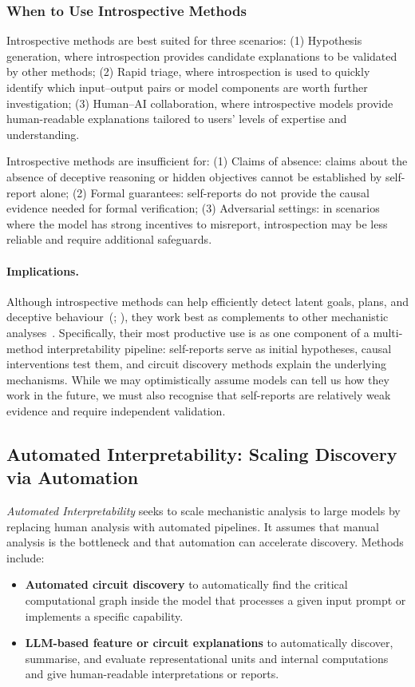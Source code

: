 \subsubsection{When to Use Introspective Methods}
Introspective methods are best suited for three scenarios: (1) Hypothesis generation, where introspection provides candidate explanations to be validated by other methods; (2) Rapid triage, where introspection is used to quickly identify which input--output pairs or model components are worth further investigation; (3) Human--AI collaboration, where introspective models provide human-readable explanations tailored to users' levels of expertise and understanding.

Introspective methods are insufficient for: (1) Claims of absence: claims about the absence of deceptive reasoning or hidden objectives cannot be established by self-report alone; (2) Formal guarantees: self-reports do not provide the causal evidence needed for formal verification; (3) Adversarial settings: in scenarios where the model has strong incentives to misreport, introspection may be less reliable and require additional safeguards.

\paragraph{Implications.}
Although introspective methods can help efficiently detect latent goals, plans, and deceptive behaviour~(; ), they work best as complements to other mechanistic analyses~. Specifically, their most productive use is as one component of a multi-method interpretability pipeline: self-reports serve as initial hypotheses, causal interventions test them, and circuit discovery methods explain the underlying mechanisms. While we may optimistically assume models can tell us how they work in the future, we must also recognise that self-reports are relatively weak evidence and require independent validation.

\subsection{Automated Interpretability: Scaling Discovery via Automation}
\label{sec:automated-interp}


\emph{Automated Interpretability} seeks to scale mechanistic analysis to large models by replacing human analysis with automated pipelines. It assumes that manual analysis is the bottleneck and that automation can accelerate discovery. Methods include:
\begin{itemize}
\item \textbf{Automated circuit discovery} to automatically find the critical computational graph inside the model that processes a given input prompt or implements a specific capability.
\item \textbf{LLM-based feature or circuit explanations} to automatically discover, summarise, and evaluate representational units and internal computations and give human-readable interpretations or reports.
\end{itemize}

